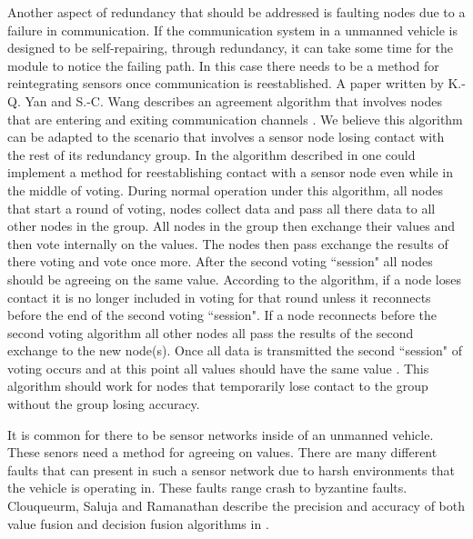 \documentclass[twoside, conference]{IEEEtran}
\begin{document}
Another aspect of redundancy that should be addressed is faulting nodes due to a failure in communication. If the communication system in a unmanned vehicle is designed to be self-repairing, through redundancy, it can take some time for the module to notice the failing path. In this case there needs to be a method for reintegrating sensors once communication is reestablished. A paper written by K.-Q. Yan and S.-C. Wang describes an agreement algorithm that involves nodes that are entering and exiting communication channels \cite{Yan2007}. We believe this algorithm can be adapted to the scenario that involves a sensor node losing contact with the rest of its redundancy group. In the algorithm described in \cite{Yan2007} one could implement a method for reestablishing contact with a sensor node even while in the middle of voting. During normal operation under this algorithm, all nodes that start a round of voting, nodes collect data and pass all there data to all other nodes in the group. All nodes in the group then exchange their values and then vote internally on the values. The nodes then pass exchange the results of there voting and vote once more. After the second voting ``session" all nodes should be agreeing on the same value. According to the algorithm, if a node loses contact it is no longer included in voting for that round unless it reconnects before the end of the second voting ``session". If a node reconnects before the second voting algorithm all other nodes all pass the results of the second exchange to the new node(s). Once all data is transmitted the second ``session" of voting occurs and at this point all values should have the same value \cite{Yan2007}. This algorithm should work for nodes that temporarily lose contact to the group without the group losing accuracy.

It is common for there to be sensor networks inside of an unmanned vehicle. These senors need a method for agreeing on values. There are many different faults that can present in such a sensor network due to harsh environments that the vehicle is operating in. These faults range crash to byzantine faults. Clouqueurm, Saluja and Ramanathan describe the precision and accuracy of both value fusion and decision fusion algorithms in \cite{clouqueur2004}. 
\end{document}
